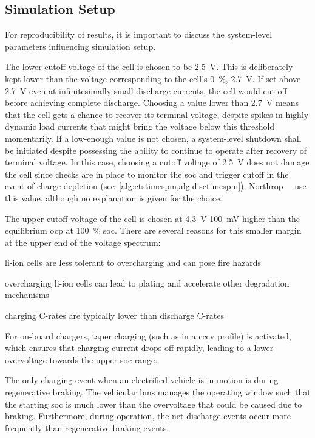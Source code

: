 \subsection{Simulation Setup}\label{subsec:basicspmsimsetup}

For  reproducibility of  results, it  is important  to discuss  the system-level
parameters influencing simulation setup.

The  lower cutoff  voltage of  the cell  is chosen  to be  \SI{2.5}{\volt}. This
is  deliberately  kept  lower  than  the voltage  corresponding  to  the  cell's
\SI{0}{\percent},  \ie{}  \SI{2.7}{\volt}.  If set  above  \SI{2.7}{\volt}  even
at  infinitesimally small  discharge  currents, the  cell  would cut-off  before
achieving complete discharge. Choosing a value lower than \SI{2.7}{V} means that
the cell gets a chance to recover its terminal voltage, despite spikes in highly
dynamic  load  currents  that  might  bring the  voltage  below  this  threshold
momentarily. If a low-enough value is  not chosen, a system-level shutdown shall
be  initiated  despite possessing  the  ability  to  continue to  operate  after
recovery  of terminal  voltage.  In  this case,  choosing  a  cutoff voltage  of
\SI{2.5}{\volt}  does  not  damage  the  cell  since  checks  are  in  place  to
monitor  the \gls{soc}  and  trigger cutoff  in the  event  of charge  depletion
(see~\cref{alg:ctstimespm,alg:disctimespm}).  Northrop~\etal~\cite{Northrop2011}
use this value, although no explanation is given for the choice.

The  upper  cutoff voltage  of  the  cell  is  chosen at  \SI{4.3}{\volt}  \ie{}
\approx\SI{100}{\milli  \volt}   higher  than   the  equilibrium   \gls{ocp}  at
\SI{100}{\percent} \gls{soc}. There are several  reasons for this smaller margin
at the upper end of the voltage spectrum:
\begin{description}[leftmargin=!,labelwidth=\widthof{\bfseries low
    probabilities},itemsep=1ex]
    \item[safety] li-ion cells are less tolerant to overcharging and can pose fire
        hazards
    \item[degradation] overcharging li-ion cells can lead to plating and
        accelerate other degradation mechanisms
    \item[low C-rates] charging C-rates are typically lower than discharge C-rates
    \item[CCCV charging] For on-board chargers, taper charging (such as in a \gls{cccv} profile) is
        activated, which ensures that charging
        current drops off rapidly, leading to a lower overvoltage towards the upper
        \gls{soc} range.
    \item[low probabilities] The only charging event when an electrified vehicle is in motion is during
        regenerative braking. The vehicular \gls{bms} manages the operating
        window such that the starting \gls{soc} is much lower than the
        overvoltage that could be caused due to braking. Furthermore, during
        operation, the net discharge events occur more frequently than
        regenerative braking events.
\end{description}

